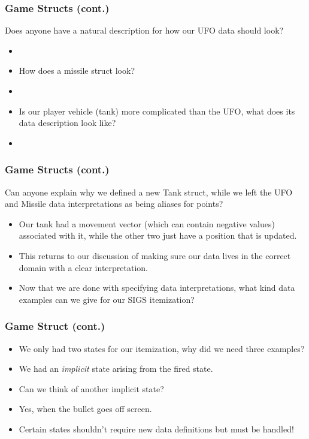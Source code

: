 \documentclass{beamer}
\begin{document}
\begin{frame}
  \frametitle{Game Structs (cont.)}
  Does anyone have a natural description for how our UFO data should look?  
  \begin{itemize}
  \item<2-> \UFOData
  \item<3-> How does a missile struct look?
  \item<4-> \MissileData
  \item<5-> Is our player vehicle (tank) more complicated than the UFO,
    what does its data description look like?
  \item<6-> \TankStruct
  \end{itemize}
\end{frame}


\begin{frame}
  \frametitle{Game Structs (cont.)}
  Can anyone explain why we defined a new Tank struct, while we
  left the UFO and Missile data interpretations as being aliases
  for points?
  \begin{itemize}
  \item<2-> Our tank had a movement vector (which can contain negative values) associated with it, while the other two just have a position that is updated.
  \item<3-> This returns to our discussion of making sure our data lives
    in the correct domain with a clear interpretation.
  \item<4-> Now that we are done with specifying data interpretations,
    what kind data examples can we give for our SIGS itemization?
  \end{itemize}
\end{frame}

\begin{frame}
  \frametitle{Game Struct (cont.)}
  \DataExamples
  \begin{itemize}
  \item<2-> We only had two states for our itemization, why did we need three
    examples?
  \item<3-> We had an \emph{implicit} state arising from the fired state.
  \item<4-> Can we think of another implicit state?
  \item<5-> Yes, when the bullet goes off screen.
  \item<6-> Certain states shouldn't require new data definitions but must
    be handled!
  \end{itemize}
\end{frame}
\end{document}
